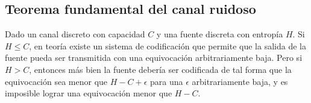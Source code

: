 \documentclass[spanish]{article}
\begin{document}
\subsection{Teorema fundamental del canal ruidoso}

Dado un canal discreto con capacidad $C$ y una fuente discreta con entropía $H$. Si $H \leq C$, en teoría existe un sistema de codificación que permite que la salida de la fuente pueda ser transmitida con una equivocación arbitrariamente baja. Pero si $H > C$, entonces más bien la fuente debería ser codificada de tal forma que la equivocación sea menor que $H - C + \epsilon$ para una $\epsilon$ arbitrariamente baja, y es imposible lograr una equivocación menor que $H - C$.






%
% 
%
\end{document}
